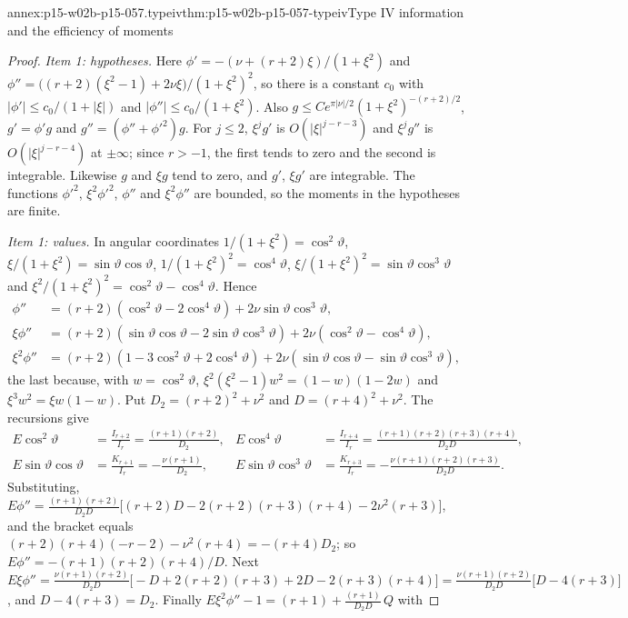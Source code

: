 \begin{annexitem}{annex:p15-w02b-p15-057.typeiv}{thm:p15-w02b-p15-057-typeiv}{Type IV information and the efficiency of moments}
\begin{proof}
\emph{Item 1: hypotheses.} Here
\(\phi'=-(\nu+(r+2)\xi)/(1+\xi^2)\) and
\(\phi''=\bigl((r+2)(\xi^2-1)+2\nu\xi\bigr)/(1+\xi^2)^2\), so there is a
constant \(c_0\) with \(|\phi'|\leq c_0/(1+|\xi|)\) and
\(|\phi''|\leq c_0/(1+\xi^2)\). Also \(g\leq Ce^{\pi|\nu|/2}
(1+\xi^2)^{-(r+2)/2}\), \(g'=\phi'g\) and \(g''=(\phi''+\phi'^2)g\). For
\(j\leq2\), \(\xi^jg'\) is \(O(|\xi|^{j-r-3})\) and \(\xi^jg''\) is
\(O(|\xi|^{j-r-4})\) at \(\pm\infty\); since \(r>-1\), the first tends to
zero and the second is integrable. Likewise \(g\) and \(\xi g\) tend to
zero, and \(g'\), \(\xi g'\) are integrable. The functions \(\phi'^2\),
\(\xi^2\phi'^2\), \(\phi''\) and \(\xi^2\phi''\) are bounded, so the moments
in the hypotheses are finite.

\emph{Item 1: values.} In angular coordinates
\(1/(1+\xi^2)=\cos^2\vartheta\), \(\xi/(1+\xi^2)=\sin\vartheta\cos\vartheta\),
\(1/(1+\xi^2)^2=\cos^4\vartheta\),
\(\xi/(1+\xi^2)^2=\sin\vartheta\cos^3\vartheta\) and
\(\xi^2/(1+\xi^2)^2=\cos^2\vartheta-\cos^4\vartheta\). Hence
\[
\begin{aligned}
 \phi''&=(r+2)(\cos^2\vartheta-2\cos^4\vartheta)
  +2\nu\sin\vartheta\cos^3\vartheta,\\
 \xi\phi''&=(r+2)(\sin\vartheta\cos\vartheta
  -2\sin\vartheta\cos^3\vartheta)
  +2\nu(\cos^2\vartheta-\cos^4\vartheta),\\
 \xi^2\phi''&=(r+2)(1-3\cos^2\vartheta+2\cos^4\vartheta)
  +2\nu(\sin\vartheta\cos\vartheta-\sin\vartheta\cos^3\vartheta),
\end{aligned}
\]
the last because, with \(w=\cos^2\vartheta\),
\(\xi^2(\xi^2-1)w^2=(1-w)(1-2w)\) and \(\xi^3w^2=\xi w(1-w)\). Put
\(D_2=(r+2)^2+\nu^2\) and \(D=(r+4)^2+\nu^2\). The recursions give
\[
\begin{aligned}
 E\cos^2\vartheta&=\frac{I_{r+2}}{I_r}=\frac{(r+1)(r+2)}{D_2},&
 E\cos^4\vartheta&=\frac{I_{r+4}}{I_r}=\frac{(r+1)(r+2)(r+3)(r+4)}{D_2D},\\
 E\sin\vartheta\cos\vartheta&=\frac{K_{r+1}}{I_r}=-\frac{\nu(r+1)}{D_2},&
 E\sin\vartheta\cos^3\vartheta&=\frac{K_{r+3}}{I_r}
 =-\frac{\nu(r+1)(r+2)(r+3)}{D_2D}.
\end{aligned}
\]
Substituting,
\(E\phi''=\frac{(r+1)(r+2)}{D_2D}\bigl[(r+2)D-2(r+2)(r+3)(r+4)
-2\nu^2(r+3)\bigr]\), and the bracket equals
\((r+2)(r+4)(-r-2)-\nu^2(r+4)=-(r+4)D_2\); so
\(E\phi''=-(r+1)(r+2)(r+4)/D\). Next
\(E\xi\phi''=\frac{\nu(r+1)(r+2)}{D_2D}\bigl[-D+2(r+2)(r+3)+2D
-2(r+3)(r+4)\bigr]=\frac{\nu(r+1)(r+2)}{D_2D}\bigl[D-4(r+3)\bigr]\), and
\(D-4(r+3)=D_2\). Finally
\(E\xi^2\phi''-1=(r+1)+\frac{(r+1)}{D_2D}\,Q\) with

\end{proof}
\end{annexitem}

